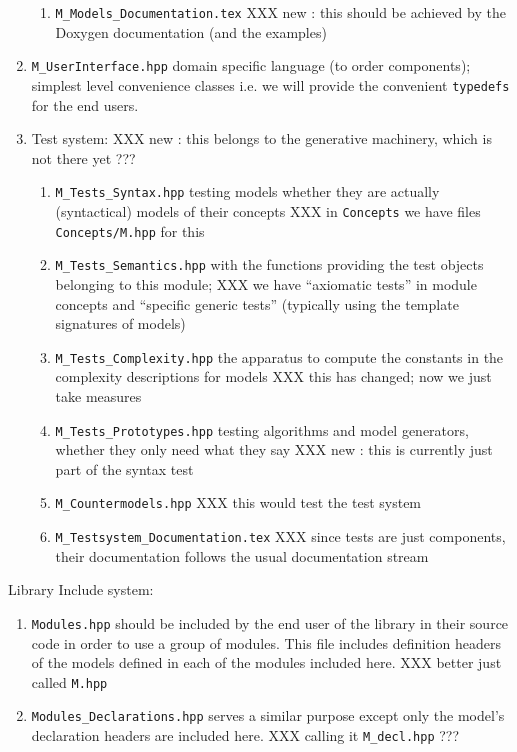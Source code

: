 \documentclass{book}
\newcommand{\filename}[1]{\texttt{#1}}
\newcommand{\name}[1]{\texttt{#1}}
\begin{document}
\begin{enumerate}
\begin{enumerate}
  \item \filename{M\_Models\_Documentation.tex} XXX new : this should be achieved by the Doxygen documentation (and the examples)
  \end{enumerate}
\item \filename{M\_UserInterface.hpp} domain specific language (to order components); simplest level convenience classes i.e. we will provide the convenient \name{typedefs} for the end users.
\item Test system: XXX new : this belongs to the generative machinery, which is not there yet ???
  \begin{enumerate}
  \item \filename{M\_Tests\_Syntax.hpp} testing models whether they are actually (syntactical) models of their concepts XXX in \texttt{Concepts} we have files \filename{Concepts/M.hpp} for this
  \item \filename{M\_Tests\_Semantics.hpp}  with the functions providing the test objects belonging to this module; XXX we have ``axiomatic tests'' in module concepts and ``specific generic tests'' (typically using the template signatures of models)
  \item \filename{M\_Tests\_Complexity.hpp} the apparatus to compute the constants in the complexity descriptions for models XXX this has changed; now we just take measures
  \item \filename{M\_Tests\_Prototypes.hpp} testing algorithms and model generators, whether they only need what they say XXX new : this is currently just part of the syntax test
  \item \filename{M\_Countermodels.hpp} XXX this would test the test system
  \item \filename{M\_Testsystem\_Documentation.tex} XXX since tests are just components, their documentation follows the usual documentation stream
  \end{enumerate}
\end{enumerate}
  
Library Include system:
\begin{enumerate}
\item \filename{Modules.hpp} should be included by the end user of the library in their source code in order to use a group of modules. This file includes definition headers of the models defined in each of the modules included here.  XXX better just called \filename{M.hpp}
\item \filename{Modules\_Declarations.hpp} serves a similar purpose except only the model's declaration headers are included here. XXX calling it \filename{M\_decl.hpp} ???
\end{enumerate}
\end{document}
